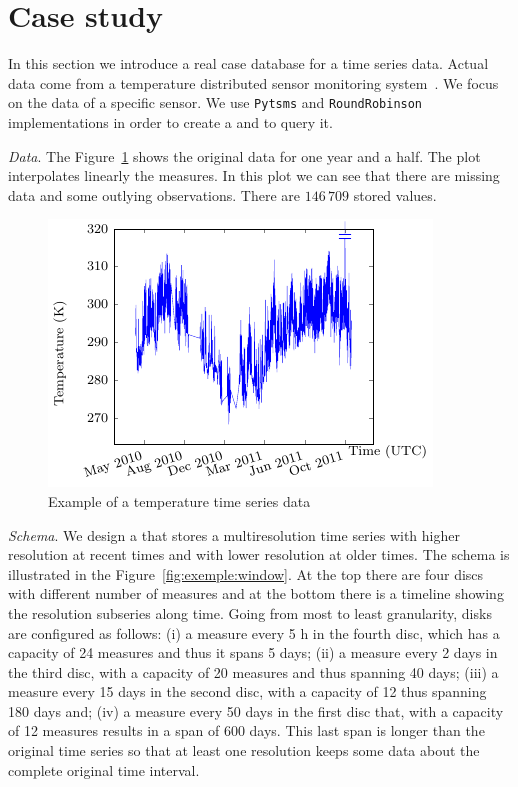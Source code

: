 
\section{Case study}
\label{sec:example}

In this section we introduce a real case database for a time series
data. Actual data come from a temperature distributed sensor
monitoring system~\cite{alippi10}. We focus on the data of a specific
sensor. We use \texttt{Pytsms} and \texttt{RoundRobinson}
implementations in order to create a  and to query it.

\emph{Data}. The Figure~\ref{fig:exemple:original} shows the original
data for one year and a half. The plot interpolates linearly the
measures. In this plot we can see that there are missing data and some
outlying observations. There are $146\,709$ stored values.

\begin{figure}[tp]
  \centering
  \includegraphics{fig_exemple_original.pdf}
  \caption{Example of a temperature time series data}
  \label{fig:exemple:original}
\end{figure}

\emph{Schema}. We design a  that stores a multiresolution
time series with higher resolution at recent times and with lower
resolution at older times. The schema is illustrated in the
Figure~\ref{fig:exemple:window}. At the top there are four discs with
different number of measures and at the bottom there is a timeline
showing the resolution subseries along time. 
%
Going from most to least granularity, disks are configured as follows:
(i) a measure every 5 h in the fourth disc, which has a capacity of 24
measures and thus it spans 5 days; (ii) a measure every 2 days in the
third disc, with a capacity of 20 measures and thus spanning 40 days;
(iii) a measure every 15 days in the second disc, with a capacity of
12 thus spanning 180 days and; (iv) a measure every 50 days in the
first disc that, with a capacity of 12 measures results in a span of
600 days. This last span is longer than the original time series so
that at least one resolution keeps some data about the complete
original time interval.

